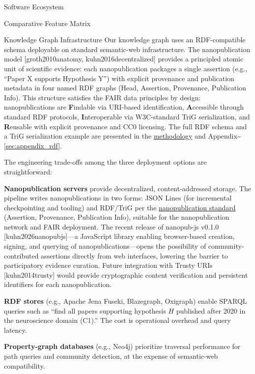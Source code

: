 \documentclass[
  ignorenonframetext,
]{beamer}
\providecommand{\citep}[1]{[#1]}
\begin{document}
\begin{frame}{Software Ecosystem}
\begin{block}{Comparative Feature Matrix}
\FloatBarrier
\end{block}
\end{frame}

\begin{frame}[allowframebreaks]{Knowledge Graph Infrastructure}
\protect{}\label{knowledge-graph-infrastructure}
Our knowledge graph uses an RDF-compatible schema deployable on standard
semantic-web infrastructure. The nanopublication model
\citep{groth2010anatomy, kuhn2016decentralized} provides a principled
atomic unit of scientific evidence: each nanopublication packages a
single assertion (e.g., ``Paper X supports Hypothesis Y'') with explicit
provenance and publication metadata in four named RDF graphs (Head,
Assertion, Provenance, Publication Info). This structure satisfies the
FAIR data principles by design: nanopublications are \textbf{F}indable
via URI-based identification, \textbf{A}ccessible through standard RDF
protocols, \textbf{I}nteroperable via W3C-standard TriG serialization,
and \textbf{R}eusable with explicit provenance and CC0 licensing. The
full RDF schema and a TriG serialization example are presented in the
\hyperref[sec:methods_kg]{methodology} and
Appendix\textasciitilde{}\ref{sec:appendix_rdf}.

The engineering trade-offs among the three deployment options are
straightforward:

\textbf{Nanopublication servers} provide decentralized,
content-addressed storage. The pipeline writes nanopublications in two
forms: JSON Lines (for incremental checkpointing and tooling) and
RDF/TriG per the \href{https://nanopub.net/}{nanopublication standard}
(Assertion, Provenance, Publication Info), suitable for the
nanopublication network and FAIR deployment. The recent release of
nanopub-js v0.1.0 \citep{kuhn2026nanopubjs}---a JavaScript library
enabling browser-based creation, signing, and querying of
nanopublications---opens the possibility of community-contributed
assertions directly from web interfaces, lowering the barrier to
participatory evidence curation. Future integration with Trusty URIs
\citep{kuhn2014trusty} would provide cryptographic content verification
and persistent identifiers for each nanopublication.

\textbf{RDF stores} (e.g., Apache Jena Fuseki, Blazegraph, Oxigraph)
enable SPARQL queries such as ``find all papers supporting hypothesis
\(H\) published after 2020 in the neuroscience domain (C1).'' The cost
is operational overhead and query latency.

\textbf{Property-graph databases} (e.g., Neo4j) prioritize traversal
performance for path queries and community detection, at the expense of
semantic-web compatibility.


\end{frame}
\end{document}
